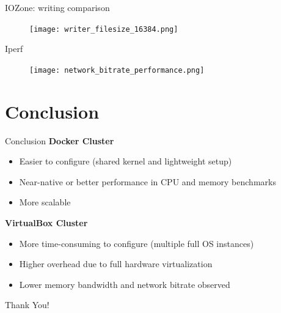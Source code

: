 \documentclass[10pt]{beamer}
\begin{document}
\begin{frame}{IOZone: writing comparison}
  \begin{figure}
    \centering
    \texttt{[image: writer\_filesize\_16384.png]}
  \end{figure}
\end{frame}

\begin{frame}[fragile]{Iperf}
\begin{figure}
  \centering
  \texttt{[image: network\_bitrate\_performance.png]}
\end{figure}
\end{frame}

\section{Conclusion}

\begin{frame}{Conclusion}
  \textbf{Docker Cluster}
  \begin{itemize}
    \item Easier to configure (shared kernel and lightweight setup)
    \item Near-native or better performance in CPU and memory benchmarks
    \item More scalable
  \end{itemize}
  \textbf{VirtualBox Cluster}
  \begin{itemize}
    \item More time-consuming to configure (multiple full OS instances)
    \item Higher overhead due to full hardware virtualization
    \item Lower memory bandwidth and network bitrate observed
  \end{itemize}
\end{frame}

{
\begin{frame}[standout]
\thispagestyle{empty}
  {\LARGE Thank You!}
\end{frame}
}
\end{document}

